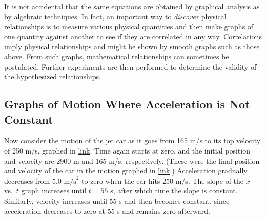 \documentclass[
]{book}
\begin{document}
It is not accidental that the same equations are obtained by graphical
analysis as by algebraic techniques. In fact, an important way to
\emph{discover} physical relationships is to measure various physical
quantities and then make graphs of one quantity against another to see
if they are correlated in any way. Correlations imply physical
relationships and might be shown by smooth graphs such as those above.
From such graphs, mathematical relationships can sometimes be
postulated. Further experiments are then performed to determine the
validity of the hypothesized relationships.

\hypertarget{fs-id2306208}{}
\hypertarget{graphs-of-motion-where-acceleration-is-not-constant}{%
\subsection{Graphs of Motion Where Acceleration is Not Constant}\label{graphs-of-motion-where-acceleration-is-not-constant}}

Now consider the motion of the jet car as it goes from 165 m/s to its
top velocity of 250 m/s, graphed in
\protect\hyperlink{import-auto-id1534076}{link}. Time again
starts at zero, and the initial position and velocity are 2900 m and 165
m/s, respectively. (These were the final position and velocity of the
car in the motion graphed in
\protect\hyperlink{import-auto-id3596921}{link}.) Acceleration
gradually decreases from \(5\text{.}\text{0\ m/s}^{2}\) to zero when the
car hits 250 m/s. The slope of the \(x{}\) vs.~\(t{}\) graph increases until
\({t = \text{55\ s}}{}\), after which time the slope is constant.
Similarly, velocity increases until 55 s and then becomes constant,
since acceleration decreases to zero at 55 s and remains zero afterward.
\end{document}
